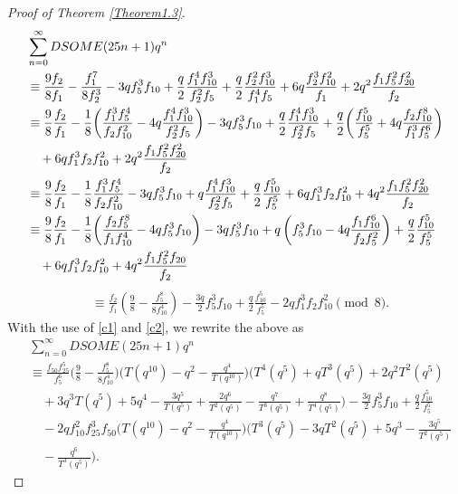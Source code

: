 \documentclass[12pt]{amsart}
\theoremstyle{definition}
\numberwithin{equation}{section}
\begin{document}
\begin{proof}[Proof of Theorem \ref{Theorem1.3}]
\begin{align*}  &\sum_{n=0}^{\infty}DSOME(25n+1)q^n\notag\\
   &\equiv  \frac{9f_2}{8f_1}-\frac{f_1^7}{8f_2^3}-3qf_5^3f_{10}+\frac{q}{2}\frac{f_1^4f_{10}^3}{f_2^2f_5}+\frac{q}{2}\frac{f_2^2f_{10}^3}{f_1^4f_5}+6q\frac{f_2^3f_{10}^2}{f_1}+2q^2\frac{f_1f_5^2f_{20}^2}{f_2}\notag\\
   &\equiv \frac{9}{8}\frac{f_2}{f_1}-\frac{1}{8}\bigg(\frac{f_1^3f_5^4}{f_2f_{10}^{2}}-4q\frac{f_1^4f_{10}^3}{f_2^2f_5}\bigg)-3qf_5^3f_{10}+\frac{q}{2}\frac{f_1^4f_{10}^3}{f_2^2f_5}+\frac{q}{2}\bigg(\frac{f_{10}^5}{f_5^5}+4q\frac{f_2f_{10}^8}{f_1^3f_5^6}\bigg)
   \notag\\
   &\quad+6qf_1^3f_2f_{10}^2+2q^2\frac{f_1f_5^2f_{20}^2}{f_2}\notag\\
   &\equiv \frac{9}{8}\frac{f_2}{f_1}-\frac{1}{8}\frac{f_1^3f_5^4}{f_2f_{10}^2}-3qf_5^3f_{10}+q\frac{f_1^4f_{10}^3}{f_2^2f_5}+\frac{q}{2}\frac{f_{10}^5}{f_5^5}+6qf_1^3f_2f_{10}^2+4q^2\frac{f_1f_5^2f_{20}^2}{f_2}\notag\\
   &\equiv \frac{9}{8}\frac{f_2}{f_1}-\frac{1}{8}\bigg(\frac{f_2f_5^8}{f_1f_{10}^4}-4qf_5^3f_{10}\bigg)-3qf_5^3f_{10}+q\left(f_5^3f_{10}-4q\frac{f_1f_{10}^6}{f_2f_5^2} \right)+\frac{q}{2}\frac{f_{10}^5}{f_5^5}
   \notag\\
   &\quad+6qf_1^3f_2f_{10}^2+4q^2\frac{f_1f_5^2f_{20}}{f_2}\end{align*}\begin{align*}
   &\equiv\frac{f_2}{f_1}\left(\frac{9}{8}-\frac{f_5^8}{8f_{10}^4}\right)-\frac{3q}{2}f_5^3f_{10}+\frac{q}{2}\frac{f_{10}^5}{f_5^5}-2qf_1^3f_2f_{10}^2\pmod{8}.
\end{align*}
 With the use of  \eqref{c1} and \eqref{c2}, we rewrite the above as
 \begin{align*}
&\sum_{n=0}^{\infty}DSOME(25n+1)q^n\\
&\equiv \frac{f_{50}f_{25}^5}{f_5^6}\bigg(\frac{9}{8}-\frac{f_5^8}{8f_{10}^4}\bigg)\bigg(T(q^{10})-q^2-\frac{q^4}{T(q^{10})}\bigg)\bigg(T^4(q^5)+qT^3(q^5)+2q^2T^2(q^5)\\
&\quad+3q^3T(q^5)+5q^4-\frac{3q^5}{T(q^5)}
    +\frac{2q^6}{T^2(q^5)}-\frac{q^7}{T^3(q^5)}+\frac{q^8}{T^4(q^5)}\bigg)-\frac{3q}{2}f_5^3f_{10}+\frac{q}{2}\frac{f_{10}^5}{f_5^5}\\
    &\quad -2qf_{10}^2f_{25}^3f_{50}\bigg(T(q^{10})-q^2-\frac{q^4}{T(q^{10})}\bigg)\bigg(T^3(q^5)-3qT^2(q^5)+5q^3-\frac{3q^5}{T^2(q^5)}\\
    &\quad-\frac{q^6}{T^3(q^5)}\bigg).
    \end{align*}

\end{proof}
\end{document}
